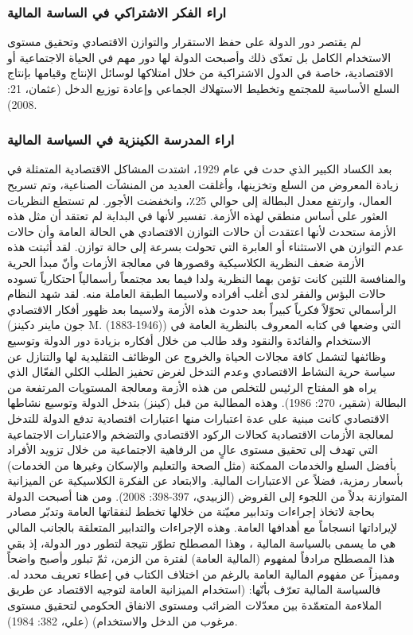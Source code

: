 \documentclass[10pt,a4paper]{report}
\begin{document}
\begin{doublespacing}
\subsubsection{اراء الفكر الاشتراكي في الساسة المالية}
لم يقتصر دور الدولة على حفظ الاستقرار والتوازن الاقتصادي وتحقيق مستوى الاستخدام الكامل بل تعدّى ذلك وأصبحت الدولة لها دور مهم في الحياة الاجتماعية أو الاقتصادية، خاصة في الدول الاشتراكية من خلال امتلاكها لوسائل الإنتاج وقيامها بإنتاج السلع الأساسية للمجتمع وتخطيط الاستهلاك الجماعي وإعادة توزيع الدخل {(عثمان، 21: 2008)}.
\subsubsection{اراء المدرسة الكينزية في السياسة المالية}
بعد الكساد الكبير الذي حدث في عام 1929، اشتدت المشاكل الاقتصادية المتمثلة في زيادة المعروض من السلع وتخزينها، وأغلقت العديد من المنشآت الصناعية، وتم تسريح العمال، وارتفع معدل البطالة إلى حوالي 25٪، وانخفضت الأجور. لم تستطع النظريات العثور على أساس منطقي لهذه الأزمة. تفسير لأنها في البداية لم تعتقد أن مثل هذه الأزمة ستحدث لأنها اعتقدت أن حالات التوازن الاقتصادي هي الحالة العامة وأن حالات عدم التوازن هي الاستثناء أو العابرة التي تحولت بسرعة إلى حالة توازن.  
لقد أثبتت هذه الأزمة ضعف النظرية الكلاسيكية وقصورها في معالجة الأزمات وأنّ مبدأ الحرية والمنافسة اللتين كانت تؤمن بهما النظرية ولدا فيما بعد مجتمعاً رأسمالياً احتكارياً تسوده حالات البؤس والفقر لدى أغلب أفراده ولاسيما الطبقة العاملة منه. لقد شهد النظام الرأسمالي تحوّلاً فكرياً كبيراً بعد حدوث هذه الأزمة ولاسيما بعد ظهور أفكار الاقتصادي {(جون ماينر دكينز  {M.}  (1883-1946))} التي وضعها في كتابه المعروف بالنظرية العامة في الاستخدام والفائدة والنقود  وقد طالب من خلال أفكاره بزيادة دور الدولة وتوسيع وظائفها لتشمل كافة مجالات الحياة والخروج عن الوظائف التقليدية لها والتنازل عن سياسة حرية النشاط الاقتصادي وعدم التدخل لغرض تحفيز الطلب الكلي الفعّال الذي يراه هو المفتاح الرئيس للتخلص من هذه الأزمة ومعالجة المستويات المرتفعة من البطالة {(شقير، 270: 1986)}. وهذه المطالبة من قبل {(كينز)} بتدخل الدولة وتوسيع نشاطها الاقتصادي كانت مبنية على عدة اعتبارات منها اعتبارات اقتصادية تدفع الدولة للتدخل لمعالجة الأزمات الاقتصادية كحالات الركود الاقتصادي والتضخم والاعتبارات الاجتماعية التي تهدف إلى تحقيق مستوى عالٍ من الرفاهية الاجتماعية من خلال تزويد الأفراد بأفضل السلع والخدمات الممكنة (مثل الصحة والتعليم والإسكان وغيرها من الخدمات) بأسعار رمزية، فضلاً عن الاعتبارات المالية. والابتعاد عن الفكرة الكلاسيكية عن الميزانية المتوازنة بدلاً من اللجوء إلى القروض {(الزبيدي، 397-398: 2008)}.
ومن هنا أصبحت الدولة بحاجة لاتخاذ إجراءات وتدابير معيّنة من خلالها تخطط لنفقاتها العامة وتدبّر مصادر لإيراداتها انسجاماً مع أهدافها العامة. وهذه الإجراءات والتدابير المتعلقة بالجانب المالي هي ما يسمى بالسياسة المالية ، وهذا المصطلح تطوّر نتيجة لتطور دور الدولة، إذ بقي هذا المصطلح مرادفاً لمفهوم {(المالية العامة)} لفترة من الزمن، ثمّ تبلور وأصبح واضحاً ومميزاً عن مفهوم المالية العامة بالرغم من اختلاف الكتاب في إعطاء تعريف محدد له. فالسياسة المالية تعرّف بأنّها: (استخدام الميزانية العامة لتوجيه الاقتصاد عن طريق الملاءمة المتعمّدة بين معدّلات الضرائب ومستوى الانفاق الحكومي لتحقيق مستوى مرغوب من الدخل والاستخدام) {(علي، 382: 1984)}.

\end{doublespacing}
\end{document}
